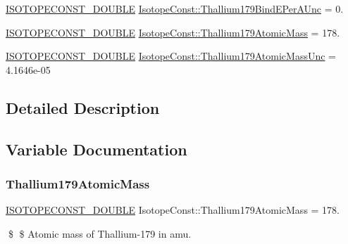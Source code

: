 \begin{DoxyCompactItemize}
\mbox{\hyperlink{group___isotope_const-_macros_ga8f45a7272ce02c0b4c65c44636ed719a}{I\+S\+O\+T\+O\+P\+E\+C\+O\+N\+S\+T\+\_\+\+D\+O\+U\+B\+LE}} \mbox{\hyperlink{group___isotope_const-_thallium-_tl179_ga42d8b113590c0f0e43d389772be5b87f}{Isotope\+Const\+::\+Thallium179\+Bind\+E\+Per\+A\+Unc}} = 0.
\item 
\mbox{\hyperlink{group___isotope_const-_macros_ga8f45a7272ce02c0b4c65c44636ed719a}{I\+S\+O\+T\+O\+P\+E\+C\+O\+N\+S\+T\+\_\+\+D\+O\+U\+B\+LE}} \mbox{\hyperlink{group___isotope_const-_thallium-_tl179_gad6657cecfeee49fe1d297688e0eb15d4}{Isotope\+Const\+::\+Thallium179\+Atomic\+Mass}} = 178.
\item 
\mbox{\hyperlink{group___isotope_const-_macros_ga8f45a7272ce02c0b4c65c44636ed719a}{I\+S\+O\+T\+O\+P\+E\+C\+O\+N\+S\+T\+\_\+\+D\+O\+U\+B\+LE}} \mbox{\hyperlink{group___isotope_const-_thallium-_tl179_ga8744fff4344a8bdd91d5782e6230f6b4}{Isotope\+Const\+::\+Thallium179\+Atomic\+Mass\+Unc}} = 4.\+1646e-\/05
\end{DoxyCompactItemize}


\subsection{Detailed Description}


\subsection{Variable Documentation}
\mbox{\label{group___isotope_const-_thallium-_tl179_gad6657cecfeee49fe1d297688e0eb15d4}} 
\subsubsection{\texorpdfstring{Thallium179\+Atomic\+Mass}{Thallium179AtomicMass}}
{\footnotesize\ttfamily \mbox{\hyperlink{group___isotope_const-_macros_ga8f45a7272ce02c0b4c65c44636ed719a}{I\+S\+O\+T\+O\+P\+E\+C\+O\+N\+S\+T\+\_\+\+D\+O\+U\+B\+LE}} Isotope\+Const\+::\+Thallium179\+Atomic\+Mass = 178.}

\$ \$ Atomic mass of Thallium-\/179 in amu. \mbox{\label{group___isotope_const-_thallium-_tl179_ga8744fff4344a8bdd91d5782e6230f6b4}} 
